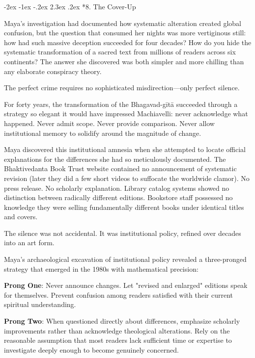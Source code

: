 \documentclass[12pt,twoside]{book}
\makeatletter
\renewcommand\section{\@startsection{section}{1}{\z@}%
{-2ex \@plus -1ex \@minus -.2ex}%
{2.3ex \@plus.2ex}%
{\normalfont\Large\bfseries}}
\makeatother
\begin{document}
\section*{8. The Cover-Up}
\thispagestyle{chapterpage}

\normalfont\justifying
Maya's investigation had documented how systematic alteration created global confusion, but the question that consumed her nights was more vertiginous still: how had such massive deception succeeded for four decades? How do you hide the systematic transformation of a sacred text from millions of readers across six continents? The answer she discovered was both simpler and more chilling than any elaborate conspiracy theory.

The perfect crime requires no sophisticated misdirection—only perfect silence.

For forty years, the transformation of the Bhagavad-gītā succeeded through a strategy so elegant it would have impressed Machiavelli: never acknowledge what happened. Never admit scope. Never provide comparison. Never allow institutional memory to solidify around the magnitude of change.

Maya discovered this institutional amnesia when she attempted to locate official explanations for the differences she had so meticulously documented. The Bhaktivedanta Book Trust website contained no announcement of systematic revision (later they did a few short videos to suffocate the worldwide clamor). No press release. No scholarly explanation. Library catalog systems showed no distinction between radically different editions. Bookstore staff possessed no knowledge they were selling fundamentally different books under identical titles and covers.

The silence was not accidental. It was institutional policy, refined over decades into an art form.

Maya's archaeological excavation of institutional policy revealed a three-pronged strategy that emerged in the 1980s with mathematical precision:

\textbf{\textbf{Prong One}}: Never announce changes. Let "revised and enlarged" editions speak for themselves. Prevent confusion among readers satisfied with their current spiritual understanding.

\textbf{\textbf{Prong Two}}: When questioned directly about differences, emphasize scholarly improvements rather than acknowledge theological alterations. Rely on the reasonable assumption that most readers lack sufficient time or expertise to investigate deeply enough to become genuinely concerned.
\end{document}
